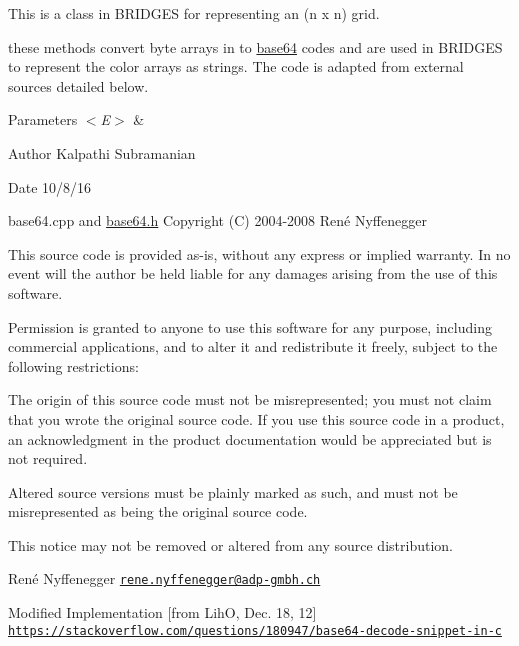 This is a class in B\+R\+I\+D\+G\+E\+S for representing an (n x n) grid.

these methods convert byte arrays in to \hyperlink{namespacebridges_1_1base64}{base64} codes and are used in B\+R\+I\+D\+G\+E\+S to represent the color arrays as strings. The code is adapted from external sources detailed below.


\begin{DoxyParams}{Parameters}
{\em $<$\+E$>$} & \\
\hline
\end{DoxyParams}
\begin{DoxyAuthor}{Author}
Kalpathi Subramanian 
\end{DoxyAuthor}
\begin{DoxyDate}{Date}
10/8/16
\end{DoxyDate}
base64.\+cpp and \hyperlink{base64_8h}{base64.\+h} Copyright (C) 2004-\/2008 René Nyffenegger

This source code is provided \textquotesingle{}as-\/is\textquotesingle{}, without any express or implied warranty. In no event will the author be held liable for any damages arising from the use of this software.

Permission is granted to anyone to use this software for any purpose, including commercial applications, and to alter it and redistribute it freely, subject to the following restrictions\+:


\begin{DoxyEnumerate}
\item The origin of this source code must not be misrepresented; you must not claim that you wrote the original source code. If you use this source code in a product, an acknowledgment in the product documentation would be appreciated but is not required.
\begin{DoxyEnumerate}
\item Altered source versions must be plainly marked as such, and must not be misrepresented as being the original source code.
\item This notice may not be removed or altered from any source distribution.
\end{DoxyEnumerate}

René Nyffenegger \href{mailto:rene.nyffenegger@adp-gmbh.ch}{\tt rene.\+nyffenegger@adp-\/gmbh.\+ch}

Modified Implementation \mbox{[}from Lih\+O, Dec. 18, 12\mbox{]} \href{https://stackoverflow.com/questions/180947/base64-decode-snippet-in-c}{\tt https\+://stackoverflow.\+com/questions/180947/base64-\/decode-\/snippet-\/in-\/c}
\end{DoxyEnumerate}

